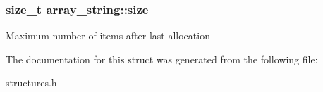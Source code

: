 \subsubsection[{size}]{\setlength{\rightskip}{0pt plus 5cm}size\+\_\+t array\+\_\+string\+::size}\label{structarray__string_a60c13969c1fb29949906ea61bb306b37}
Maximum number of items after last allocation 

The documentation for this struct was generated from the following file\+:\begin{DoxyCompactItemize}
\item 
structures.\+h\end{DoxyCompactItemize}
